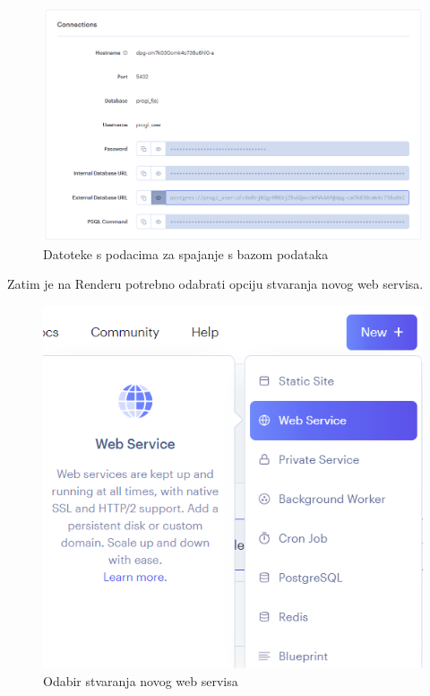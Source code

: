 			\begin{figure}[H]
				\includegraphics[width=\textwidth]{slike/upute/parametriBaze.png} %
				\caption{Datoteke s podacima za spajanje s bazom podataka}
				\label{fig:parametriBaze} %
			\end{figure}
			
			Zatim je na Renderu potrebno odabrati opciju stvaranja novog web servisa.
			
			\begin{figure}[H]
				\includegraphics[scale=0.8]{slike/upute/odabirStvaranjaWebServisa.png} %
				\centering
				\caption{Odabir stvaranja novog web servisa}
				\label{fig:odabirStvaranjaWebServisa} %
			\end{figure}
			
